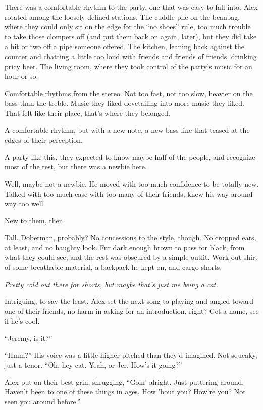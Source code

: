 There was a comfortable rhythm to the party, one that was easy to fall into. Alex rotated among the loosely defined stations. The cuddle-pile on the beanbag, where they could only sit on the edge for the ``no shoes'' rule, too much trouble to take those clompers off (and put them back on again, later), but they did take a hit or two off a pipe someone offered. The kitchen, leaning back against the counter and chatting a little too loud with friends and friends of friends, drinking pricy beer. The living room, where they took control of the party's music for an hour or so.

Comfortable rhythms from the stereo. Not too fast, not too slow, heavier on the bass than the treble. Music they liked dovetailing into more music they liked. That felt like their place, that's where they belonged.

A comfortable rhythm, but with a new note, a new bass-line that teased at the edges of their perception.

A party like this, they expected to know maybe half of the people, and recognize most of the rest, but there was a newbie here.

Well, maybe not a newbie. He moved with too much confidence to be totally new. Talked with too much ease with too many of their friends, knew his way around way too well.

New to them, then.

Tall. Doberman, probably? No concessions to the style, though. No cropped ears, at least, and no haughty look. Fur dark enough brown to pass for black, from what they could see, and the rest was obscured by a simple outfit. Work-out shirt of some breathable material, a backpack he kept on, and cargo shorts.

\emph{Pretty cold out there for shorts, but maybe that's just me being a cat.}

Intriguing, to say the least. Alex set the next song to playing and angled toward one of their friends, no harm in asking for an introduction, right? Get a name, see if he's cool.

``Jeremy, is it?''

``Hmm?'' His voice was a little higher pitched than they'd imagined. Not squeaky, just a tenor. ``Oh, hey cat. Yeah, or Jer. How's it going?''

Alex put on their best grin, shrugging, ``Goin' alright. Just puttering around. Haven't been to one of these things in ages. How 'bout you? How're you? Not seen you around before.''

